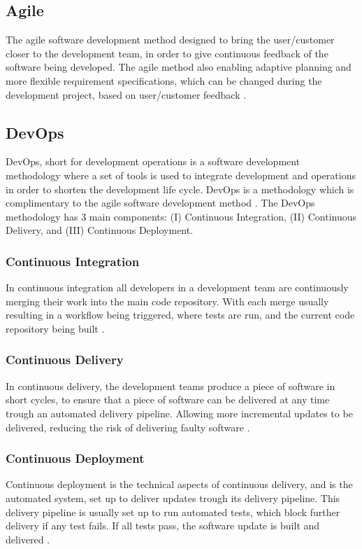 \subsection{Agile}
The agile software development method designed to bring the user/customer closer to the development team, in order to give continuous feedback of the software being developed. The agile method also enabling adaptive planning and more flexible requirement specifications, which can be changed during the development project, based on user/customer feedback \cite{agile_software_development_wiki_2023}.

\subsection{DevOps}
DevOps, short for development operations is a software development methodology where a set of tools is used to integrate development and operations in order to shorten the development life cycle. DevOps is a methodology which is complimentary to the agile software development method \cite{devops_wiki_2023}. The DevOps methodology has 3 main components: (I) Continuous Integration, (II) Continuous Delivery, and (III) Continuous Deployment.

\subsubsection{Continuous Integration}
In continuous integration all developers in a development team are continuously merging their work into the main code repository. With each merge usually resulting in a workflow being triggered, where tests are run, and the current code repository being built \cite{continuous_integration_wiki_2023}.

\subsubsection{Continuous Delivery}
In continuous delivery, the development teams produce a piece of software in short cycles, to ensure that a piece of software can be delivered at any time trough an automated delivery pipeline. Allowing more incremental updates to be delivered, reducing the risk of delivering faulty software \cite{continuous_delivery_wiki_2023}.

\subsubsection{Continuous Deployment}
Continuous deployment is the technical aspects of continuous delivery, and is the automated system, set up to deliver updates trough its delivery pipeline. This delivery pipeline is usually set up to run automated tests, which block further delivery if any test fails. If all tests pass, the software update is built and delivered \cite{continuous_deployment_wiki_2023}.

